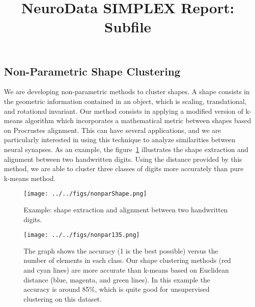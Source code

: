 \documentclass[simplex.tex]{subfiles}
\title{NeuroData SIMPLEX Report: Subfile}
\begin{document}

\subsection{Non-Parametric Shape Clustering}

We are developing non-parametric methods to cluster shapes. A shape
consists in the geometric information contained in an object, which
is scaling, translational, and rotational invariant. Our method consists
in applying a modified version of k-means algorithm which incorporates a
mathematical metric between shapes based on Procrustes alignment. This
can have several applications, and we are particularly interested in
using this technique to analyze similarities between neural synapses. As
an example, the figure~\ref{fig:nonparShape} illustrates the shape extraction and
alignment between two handwritten digits. Using the distance provided by
this method, we are able to cluster three classes of digits more
accurately than pure k-means method. 

\begin{figure}[h!]
\begin{cframed}
\centering
\texttt{[image: ../../figs/nonparShape.png]}
\caption{
 Example: shape extraction and alignment between two handwritten digits.
}
\label{fig:nonparShape}
\end{cframed}
\end{figure}

\begin{figure}[h!]
\begin{cframed}
\centering
\texttt{[image: ../../figs/nonpar135.png]}
\caption{
The graph shows the accuracy
(1 is the best possible) versus the number of elements in each class.
Our shape clustering methods (red and cyan lines) are more accurate than
k-means based on Euclidean distance (blue, magenta, and green lines). In
this example the accuracy is around 85\%, which is quite good for
unsupervised clustering on this dataset.
}
\label{fig:nonpar135}
\end{cframed}
\end{figure}
\end{document}

